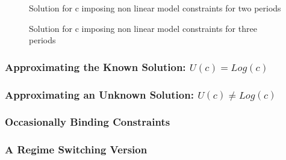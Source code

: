 \documentclass[12pt]{article}
\begin{document}
\begin{figure}
  \centering
 \caption{Solution for c imposing non linear model constraints for two periods}
  \caption{Solution for c imposing non linear model constraints for three periods}
  \label{fig:cfuncsecond}
\end{figure}

\subsubsection{Approximating the Known Solution: $U(c) = Log(c)$ }
\label{sec:recov-known-solut}

\subsubsection{Approximating an Unknown Solution: $U(c) \ne Log(c)$ }
\label{sec:unknown-solutions}

\subsubsection{Occasionally Binding Constraints}
\label{sec:obc-solut}


\subsubsection{A Regime Switching Version}
\label{sec:regime-switch-model}





\end{document}
